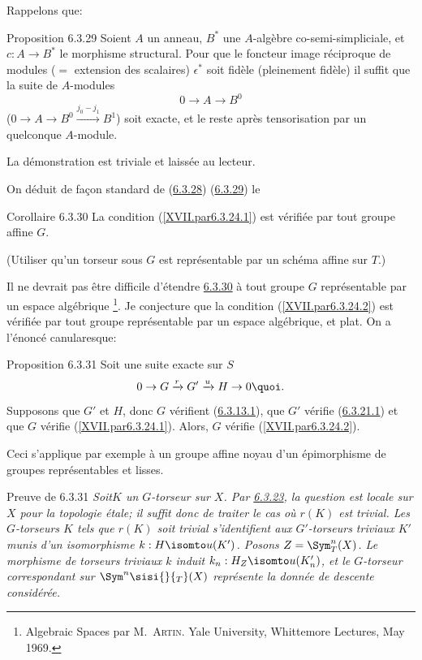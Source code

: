 Rappelons que:

\begin{enonce*}{Proposition 6.3.29}
Soient $A$ un anneau, $B^{\ast}$ une $A$-algèbre co-semi-simpliciale,
et $c:A\rightarrow B^{\ast}$ le morphisme structural. Pour que le
foncteur image réciproque de modules ($=$ extension des scalaires)
$\epsilon^{\ast}$ soit fidèle (\resp pleinement fidèle) il suffit que
la suite de $A$-modules
$$
0\longrightarrow A\longrightarrow B^{0}
$$
(\resp\pageoriginale $0\rightarrow A\rightarrow
B^{0}\xrightarrow{j_{0}-j_{1}}B^{1}$)
soit exacte, et le reste après tensorisation par un quelconque $A$-module.
\end{enonce*}

La démonstration est triviale et laissée au lecteur.

On déduit de façon standard de (\hyperref[XVII.prop6.3.28]{6.3.28}) (\hyperref[XVII.prop6.3.29]{6.3.29}) le

\begin{enonce*}{Corollaire 6.3.30}
La condition (\ref{XVII.par6.3.24.1}) est vérifiée par tout groupe affine $G$.
\end{enonce*}

(Utiliser qu'un torseur sous $G$ est représentable par un schéma
affine sur $T$.)

Il ne devrait pas être difficile d'étendre \hyperref[XVII.cor6.3.30]{6.3.30} à tout groupe $G$
représentable par un espace algébrique \footnote[1]{\label{XVII.noteArtin2}Algebraic Spaces
par M.~\textsc{Artin}. Yale University, Whittemore Lectures, May 1969.}. Je
conjecture que la condition (\ref{XVII.par6.3.24.2}) est vérifiée par tout groupe
représentable par un espace algébrique, et plat. On a l'énoncé
canularesque:

\begin{enonce*}{Proposition 6.3.31}
Soit une suite exacte sur $S$
$$
0\rightarrow G\xrightarrow{r}G'\xrightarrow{u}H\rightarrow 0{\quoi}.
$$ Supposons que $G'$ et $H$, donc $G$ vérifient
(\hyperref[XVII.par6.3.13.1]{6.3.13.1}), que $G'$ vérifie (\hyperref[XVII.par6.3.21.1]{6.3.21.1}) et
que $G$ vérifie (\ref{XVII.par6.3.24.1}). Alors, $G$ vérifie
(\ref{XVII.par6.3.24.2}).
\end{enonce*}

Ceci s'applique par exemple à un groupe affine noyau d'un épimorphisme
de groupes représentables et lisses.

\begin{enonce*}{Preuve de 6.3.31}
\emph{Soit\pageoriginale $K$ un $G$-torseur sur
$X$. Par \hyperref[XVII.prop6.3.23]{6.3.23}, la question est locale sur $X$ pour la topologie
étale; il suffit donc de traiter le cas où $r(K)$ est trivial. Les
$G$-torseurs $K$ tels que $r(K)$ soit trivial s'identifient aux
$G'$-torseurs triviaux $K'$ munis d'un isomorphisme
$k:H\isomto u(K')$. Posons $Z=\Sym^{n}_{T}(X)$. Le morphisme
de torseurs triviaux $k$ induit $k_{n}:H_{Z}\isomto
u(K'_{n})$, et le $G$-torseur correspondant sur $\Sym^{n}\sisi{}{_T}(X)$
représente la donnée de descente considérée.}
\end{enonce*}

